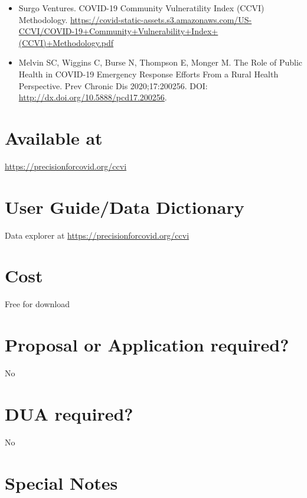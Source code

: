 \documentclass[
]{book}
\providecommand{\tightlist}{%
  \setlength{\itemsep}{0pt}\setlength{\parskip}{0pt}}
\begin{document}
\begin{itemize}
\tightlist
\item
  Surgo Ventures. COVID-19 Community Vulneratility Index (CCVI) Methodology. \url{https://covid-static-assets.s3.amazonaws.com/US-CCVI/COVID-19+Community+Vulnerability+Index+(CCVI)+Methodology.pdf}
\item
  Melvin SC, Wiggins C, Burse N, Thompson E, Monger M. The Role of Public Health in COVID-19 Emergency Response Efforts From a Rural Health Perspective. Prev Chronic Dis 2020;17:200256. DOI: \url{http://dx.doi.org/10.5888/pcd17.200256}.
\end{itemize}

\hypertarget{available-at-21}{%
\section{Available at}\label{available-at-21}}

\url{https://precisionforcovid.org/ccvi}

\hypertarget{user-guidedata-dictionary-21}{%
\section{User Guide/Data Dictionary}\label{user-guidedata-dictionary-21}}

Data explorer at \url{https://precisionforcovid.org/ccvi}

\hypertarget{cost-21}{%
\section{Cost}\label{cost-21}}

Free for download

\hypertarget{proposal-or-application-required-21}{%
\section{Proposal or Application required?}\label{proposal-or-application-required-21}}

No

\hypertarget{dua-required-21}{%
\section{DUA required?}\label{dua-required-21}}

No

\hypertarget{special-notes-21}{%
\section{Special Notes}\label{special-notes-21}}
\end{document}
